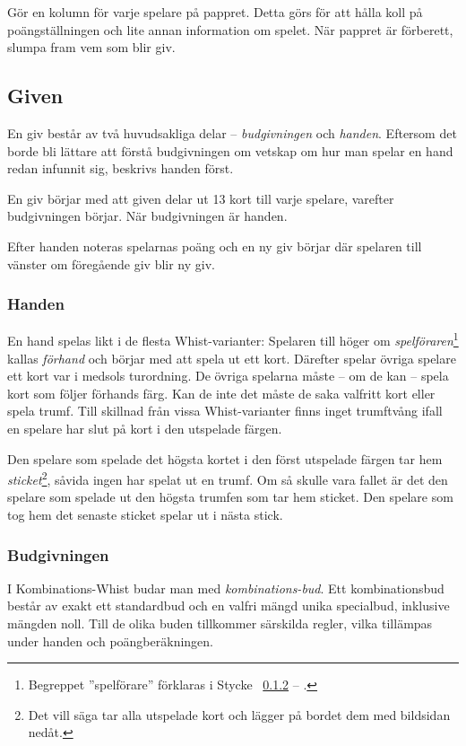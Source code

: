 \documentclass[a4paper]{article} %
\renewcommand{\sectionref}[1]{%
	\ref{sec:#1} -- \nameref{sec:#1}%
}
\begin{document}
	Gör en kolumn för varje spelare på pappret. Detta görs för att hålla koll på poängställningen och lite annan information om spelet. När pappret är förberett, slumpa fram vem som blir giv.

	\subsection{Given}
	En giv består av två huvudsakliga delar -- \emph{budgivningen} och \emph{handen}. Eftersom det borde bli lättare att förstå budgivningen om vetskap om hur man spelar en hand redan infunnit sig, beskrivs handen först.

	En giv börjar med att given delar ut 13 kort till varje spelare, varefter budgivningen börjar. När budgivningen är handen.

	Efter handen noteras spelarnas poäng och en ny giv börjar där spelaren till vänster om föregående giv blir ny giv.

	\subsubsection{Handen}
	En hand spelas likt i de flesta Whist-varianter: Spelaren till höger om \emph{spelföraren}\footnote{Begreppet ''spelförare'' förklaras i Stycke~\sectionref{bidding}.} kallas \emph{förhand} och börjar med att spela ut ett kort. Därefter spelar övriga spelare ett kort var i medsols turordning. De övriga spelarna måste -- om de kan -- spela kort som följer förhands färg. Kan de inte det måste de saka valfritt kort eller spela trumf. Till skillnad från vissa Whist-varianter finns inget trumftvång ifall en spelare har slut på kort i den utspelade färgen.

	Den spelare som spelade det högsta kortet i den först utspelade färgen tar hem \emph{sticket}\footnote{Det vill säga tar alla utspelade kort och lägger på bordet dem med bildsidan nedåt.}, såvida ingen har spelat ut en trumf. Om så skulle vara fallet är det den spelare som spelade ut den högsta trumfen som tar hem sticket. Den spelare som tog hem det senaste sticket spelar ut i nästa stick.

	\subsubsection{Budgivningen}
	\label{sec:bidding}
	I Kombinations-Whist budar man med \emph{kombinations-bud}. Ett kombinationsbud består av exakt ett standardbud och en valfri mängd unika specialbud, inklusive mängden noll. Till de olika buden tillkommer särskilda regler, vilka tillämpas under handen och poängberäkningen.
\end{document}
